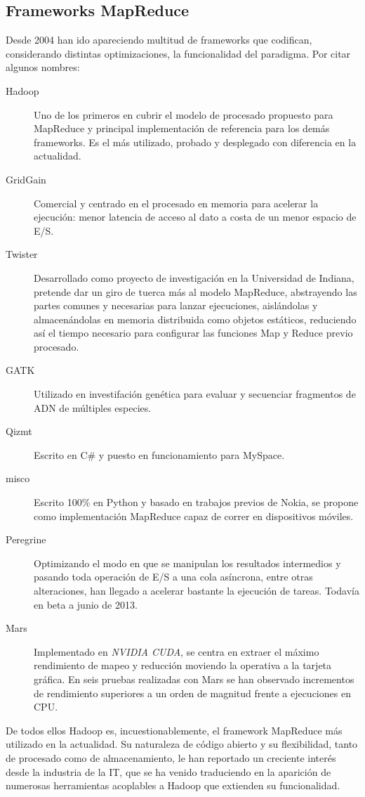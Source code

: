 \subsection{Frameworks MapReduce}\label{subsec:frameworksmapred}
\noindent Desde 2004 han ido apareciendo multitud de frameworks que codifican, considerando distintas optimizaciones, la funcionalidad del paradigma. Por citar algunos nombres:

\begin{description}
 \item[Hadoop] \cite{hadoopdefguide} Uno de los primeros en cubrir el modelo de procesado pro\-pues\-to para MapReduce y principal implementaci\'on de referencia para los dem\'as frameworks. Es el m\'as utilizado, probado y desplegado con diferencia en la actualidad.
 \item[GridGain] \cite{gridgainvshadoop} Comercial y centrado en el procesado en memoria para ace\-le\-rar la ejecuci\'on: menor latencia de acceso al dato a costa de un menor espacio de E/S.
 \item[Twister] \cite{twister} Desarrollado como proyecto de investigaci\'on en la Universidad de Indiana, pretende dar un giro de tuerca m\'as al modelo MapReduce, abstrayendo las partes comunes y necesarias para lanzar ejecuciones, aisl\'andolas y almacen\'andolas en memoria distribuida como objetos est\'aticos, reduciendo as\'i el tiempo necesario para configurar las funciones Map y Reduce previo procesado.
 \item[GATK] \cite{gatk} Utilizado en investifaci\'on gen\'etica para evaluar y secuenciar fragmentos de ADN de m\'ultiples especies.
 \item[Qizmt] \cite{qizmt} Escrito en C\# y puesto en funcionamiento para MySpace.
 \item[misco] \cite{misco} Escrito 100\% en Python y basado en trabajos previos de Nokia, se propone como implementaci\'on MapReduce capaz de correr en dispositivos m\'oviles.
 \item[Peregrine] \cite{peregrine} Optimizando el modo en que se manipulan los resultados intermedios y pasando toda operaci\'on de E/S a una cola as\'incrona, entre otras alteraciones, han llegado a acelerar bastante la ejecuci\'on de tareas. Todav\'ia en beta a junio de 2013.
 \item[Mars] \cite{mars} Implementado en \emph{NVIDIA CUDA}, se centra en extraer el m\'aximo rendimiento de mapeo y reducci\'on moviendo la operativa a la tarjeta gr\'afica. En seis pruebas realizadas con Mars se han observado incrementos de rendimiento superiores a un orden de magnitud frente a ejecuciones en CPU.

\end{description}

De todos ellos Hadoop es, incuestionablemente, el framework MapReduce m\'as utilizado en la actualidad. Su naturaleza de c\'odigo abierto y su flexibilidad, tanto de procesado como de almacenamiento, le han reportado un creciente inter\'es desde la industria de la IT, que se ha venido traduciendo en la aparici\'on de numerosas herramientas acoplables a Hadoop que extienden su funcionalidad.


